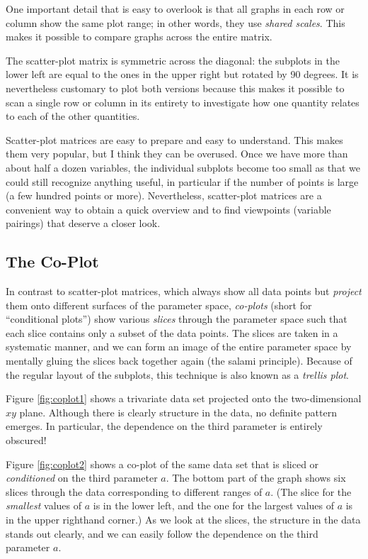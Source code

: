 One important detail that is easy to overlook is that all graphs in
each row or column show the same plot range; in other words, they
use \emph{shared scales}. This makes it possible to compare graphs
across the entire matrix. 

The scatter-plot matrix is symmetric across the diagonal: the subplots
in the lower left are equal to the ones in the upper right but rotated
by 90 degrees. It is nevertheless customary to plot both versions
because this makes it possible to scan a single row or column in its
entirety to investigate how one quantity relates to each of the other
quantities.

Scatter-plot matrices are easy to prepare and easy to understand. This
makes them very popular, but I think they can be overused. Once we
have more than about half a dozen variables, the individual subplots\vadjust{\pagebreak}
become too small as that we could still recognize anything useful, in
particular if the number of points is large (a few hundred points or
more). Nevertheless, scatter-plot matrices are a convenient way to
obtain a quick overview and to find viewpoints (variable pairings)
that deserve a closer look.
% 
% 

\subsection{The Co-Plot}


In contrast to scatter-plot matrices, which always show all data
points but \emph{project} them onto different surfaces of the
parameter space, \emph{co-plots} (short for ``conditional plots'')
show various \emph{slices} through the parameter space such that each
slice contains only a subset of the data points. The slices are taken
in a systematic manner, and we can form an image of the entire
parameter space by mentally gluing the slices back together again
(the salami principle). Because of the regular layout of the subplots,
this technique is also known as a \emph{trellis plot}.

Figure \ref{fig:coplot1} shows a trivariate data set projected onto
the two-dimensional $xy$ plane. Although there is clearly structure in
the data, no definite pattern emerges. In particular, the dependence
on the third parameter is entirely obscured!

Figure \ref{fig:coplot2} shows a co-plot of the same data set that is
sliced or \emph{conditioned} on the third parameter $a$.  The bottom 
part of the graph shows six slices through the data corresponding to
different ranges of $a$. (The slice for the \emph{smallest} values of
$a$ is in the lower left, and the one for the largest values of $a$
is in the upper righthand corner.) As we look at the slices, the
structure in the data stands out clearly, and we can easily follow the
dependence on the third parameter $a$.

